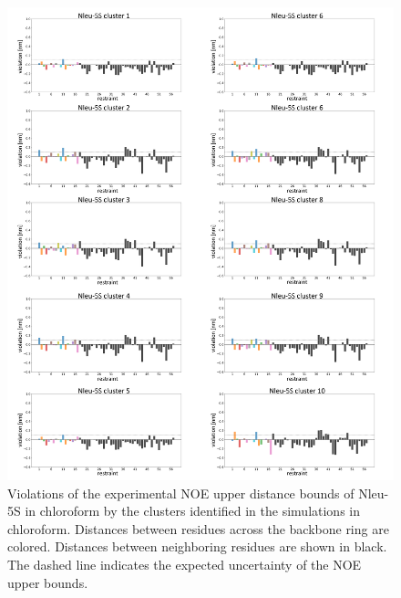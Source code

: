 \begin{figure}
    \centering
    \includegraphics[width=\textwidth]{7_chapter_5/fig/results/NMR_5S.png}
    \caption{ Violations  of  the  experimental  NOE  upper  distance  bounds  of  Nleu-5S  in chloroform by the clusters identified in the simulations in chloroform. Distances             between residues across the backbone ring are colored. Distances between neighboring residues are shown in black. The dashed line indicates the expected uncertainty of          the NOE upper bounds.}
    \label{fig: SINOE violations Nleu-5S}
\end{figure}

